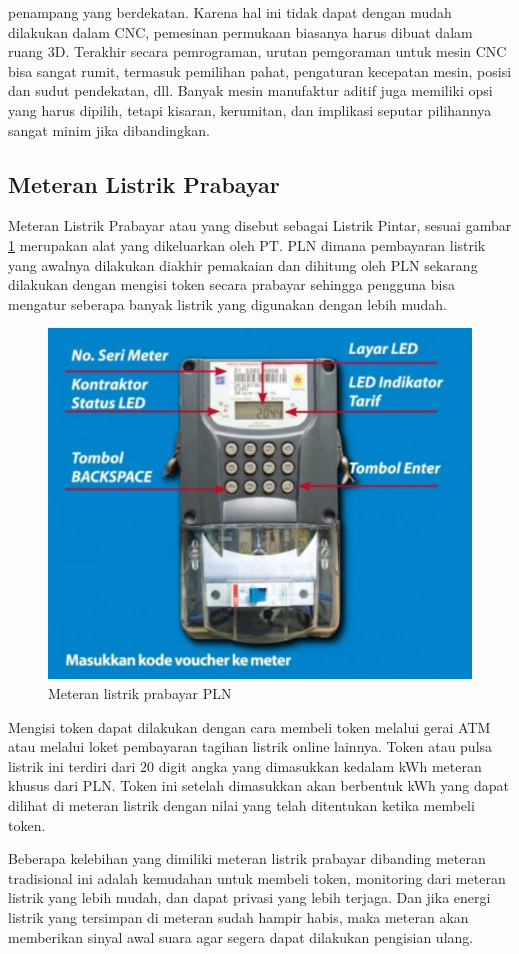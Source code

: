 penampang yang berdekatan. Karena hal ini tidak dapat dengan mudah dilakukan dalam CNC, pemesinan permukaan biasanya harus dibuat dalam ruang 3D. Terakhir secara pemrograman, urutan pemgoraman untuk mesin CNC bisa sangat rumit, termasuk pemilihan pahat, pengaturan kecepatan mesin, posisi dan sudut pendekatan, dll. Banyak mesin manufaktur aditif juga memiliki opsi yang harus dipilih, tetapi kisaran, kerumitan, dan implikasi seputar pilihannya sangat minim jika dibandingkan. \parencite{3dprinting}

\subsection{Meteran Listrik Prabayar}
Meteran Listrik Prabayar atau yang disebut sebagai Listrik Pintar, sesuai gambar \ref{fig:meteran-prabayar} merupakan alat yang dikeluarkan oleh PT. PLN dimana pembayaran listrik yang awalnya dilakukan diakhir pemakaian dan dihitung oleh PLN sekarang dilakukan dengan mengisi token secara prabayar sehingga pengguna bisa mengatur seberapa banyak listrik yang digunakan dengan lebih mudah.

\begin{figure}[H]
    \centering
    \includegraphics[width=0.5\linewidth]{gambar/meteran-prabayar.png}
    \caption{Meteran listrik prabayar PLN}
    \label{fig:meteran-prabayar}
\end{figure}

Mengisi token dapat dilakukan dengan cara membeli token melalui gerai ATM atau melalui loket pembayaran tagihan listrik online lainnya. Token atau pulsa listrik ini terdiri dari 20 digit angka yang dimasukkan kedalam kWh meteran khusus dari PLN. Token ini setelah dimasukkan akan berbentuk kWh yang dapat dilihat di meteran listrik dengan nilai yang telah ditentukan ketika membeli token.

Beberapa kelebihan yang dimiliki meteran listrik prabayar dibanding meteran tradisional ini adalah kemudahan untuk membeli token, monitoring dari meteran listrik yang lebih mudah, dan dapat privasi yang lebih terjaga. Dan jika energi listrik yang tersimpan di meteran sudah hampir habis, maka meteran akan memberikan sinyal awal suara agar segera dapat dilakukan pengisian ulang.